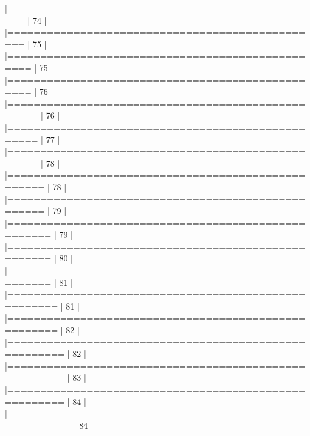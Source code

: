 \documentclass[10pt]{article}
\newenvironment{CodeChunk}{}{}
\begin{document}
\begin{CodeChunk}
\begin{CodeChunk}
\begin{CodeOutput}
  |================================================                 |  74%
  |                                                                       
  |================================================                 |  75%
  |                                                                       
  |=================================================                |  75%
  |                                                                       
  |=================================================                |  76%
  |                                                                       
  |==================================================               |  76%
  |                                                                       
  |==================================================               |  77%
  |                                                                       
  |==================================================               |  78%
  |                                                                       
  |===================================================              |  78%
  |                                                                       
  |===================================================              |  79%
  |                                                                       
  |====================================================             |  79%
  |                                                                       
  |====================================================             |  80%
  |                                                                       
  |====================================================             |  81%
  |                                                                       
  |=====================================================            |  81%
  |                                                                       
  |=====================================================            |  82%
  |                                                                       
  |======================================================           |  82%
  |                                                                       
  |======================================================           |  83%
  |                                                                       
  |======================================================           |  84%
  |                                                                       
  |=======================================================          |  84%

\end{CodeOutput}
\end{CodeChunk}
\end{CodeChunk}
\end{document}
